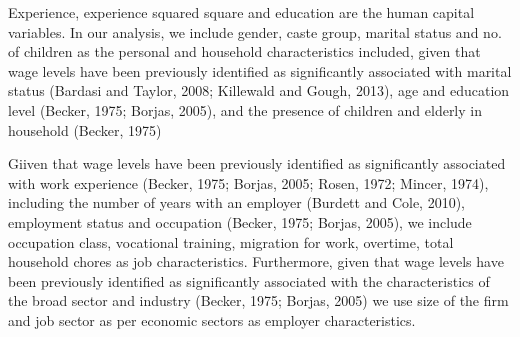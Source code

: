 Experience, experience squared square and education are the human capital variables. In our analysis, we include gender, caste group,  marital status and no. of children as the personal and household characteristics included, given that wage levels have been previously identified as significantly associated with marital status (Bardasi and Taylor, 2008; Killewald and Gough, 2013), age and education level (Becker, 1975; Borjas, 2005), and the presence of children and elderly in household (Becker, 1975)  \par

Giiven that wage levels have been previously identified as significantly associated with work experience (Becker, 1975; Borjas, 2005; Rosen, 1972; Mincer, 1974), including the number of years with an employer (Burdett and Cole, 2010), employment status and occupation (Becker, 1975; Borjas, 2005), we include occupation class, vocational training, migration for work, overtime, total household chores as job characteristics. Furthermore, given that wage levels have been previously identified as significantly associated with the characteristics of the broad sector and industry (Becker, 1975; Borjas, 2005) we use size of the firm and job sector as per economic sectors as employer characteristics. \par



 
                            
